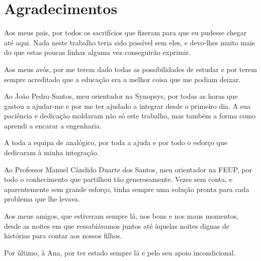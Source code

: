 \chapter*{Agradecimentos}

Aos meus pais, por todos os sacrifícios que fizeram para que eu pudesse chegar até aqui. Nada neste trabalho teria sido possível sem eles, e devo-lhes muito mais do que estas poucas linhas alguma vez conseguirão exprimir.

Aos meus avós, por me terem dado todas as possibilidades de estudar e por terem sempre acreditado que a educação era a melhor coisa que me podiam deixar.

Ao João Pedro Santos, meu orientador na Synopsys, por todas as horas que gastou a ajudar-me e por me ter ajudado a integrar desde o primeiro dia. A sua paciência e dedicação moldaram não só este trabalho, mas também a forma como aprendi a encarar a engenharia.

A toda a equipa de analógico, por toda a ajuda e por todo o esforço que dedicaram à minha integração.

Ao Professor Manuel Cândido Duarte dos Santos, meu orientador na FEUP, por todo o conhecimento que partilhou tão generosamente. Vezes sem conta, e aparentemente sem grande esforço, tinha sempre uma solução pronta para cada problema que lhe levava.

Aos meus amigos, que estiveram sempre lá, nos bons e nos maus momentos, desde as noites em que ressabiávamos juntos até àquelas noites dignas de histórias para contar aos nossos filhos.

Por último, à Ana, por ter estado sempre lá e pelo seu apoio incondicional.


\vspace{10mm}
